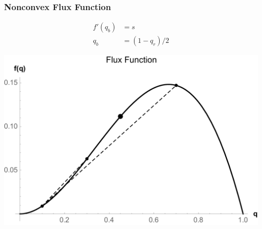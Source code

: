 \documentclass[10pt]{beamer}
\begin{document}
    \begin{frame}
      \frametitle{Nonconvex Flux Function}
      \begin{align*}
        f'(q_b) &= s \\
        q_b &= (1 - q_r)/2 
      \end{align*}
      \begin{center}
        \includegraphics[scale=0.35]{Figures/FluxFunction2Cases.pdf}
      \end{center}
    \end{frame}
\end{document}
